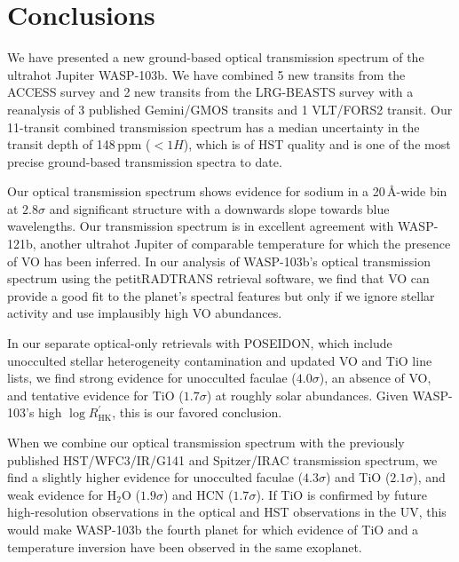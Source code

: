 \documentclass[twocolumn]{aastex63}
\begin{document}


\section{Conclusions}
\label{sec:conclusions}

We have presented a new ground-based optical transmission spectrum of the ultrahot Jupiter WASP-103b. We have combined 5 new transits from the ACCESS survey and 2 new transits from the LRG-BEASTS survey with a reanalysis of 3 published Gemini/GMOS transits and 1 VLT/FORS2 transit. Our 11-transit combined transmission spectrum has a median uncertainty in the transit depth of 148\,ppm ($<1 H$), which is of HST quality and is one of the most precise ground-based transmission spectra to date.

Our optical transmission spectrum shows evidence for sodium in a 20\,\AA-wide bin at $2.8\sigma$ and significant structure with a downwards slope towards blue wavelengths. Our transmission spectrum is in excellent agreement with WASP-121b, another ultrahot Jupiter of comparable temperature for which the presence of VO has been inferred. In our analysis of WASP-103b's optical transmission spectrum using the petitRADTRANS retrieval software, we find that VO can provide a good fit to the planet's spectral features but only if we ignore stellar activity and use implausibly high VO abundances.

In our separate optical-only retrievals with POSEIDON, which include unocculted stellar heterogeneity contamination and updated VO and TiO line lists, we find strong evidence for unocculted faculae ($4.0\sigma$), an absence of VO, and tentative evidence for TiO ($1.7\sigma$) at roughly solar abundances. Given WASP-103's high $\log R^{'}_{\mathrm{HK}}$, this is our favored conclusion.

When we combine our optical transmission spectrum with the previously published HST/WFC3/IR/G141 and Spitzer/IRAC transmission spectrum, we find a slightly higher evidence for unocculted faculae ($4.3\sigma$) and TiO ($2.1\sigma$), and weak evidence for H$_2$O ($1.9\sigma$) and HCN ($1.7\sigma$). If TiO is confirmed by future high-resolution observations in the optical and HST observations in the UV, this would make WASP-103b the fourth planet for which evidence of TiO and a temperature inversion have been observed in the same exoplanet.
\end{document}
